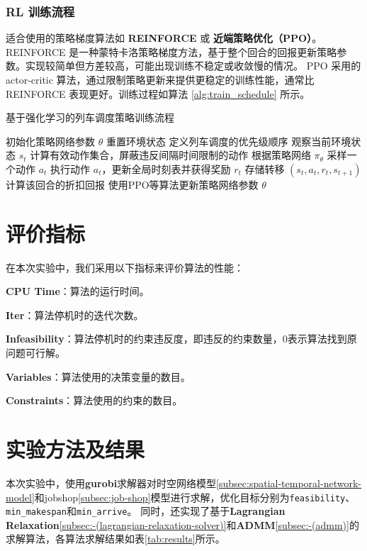 \documentclass{article}
\begin{document}
    \subsubsection{RL 训练流程}
    适合使用的策略梯度算法如 \textbf{REINFORCE} 或 \textbf{近端策略优化（PPO）}。
    REINFORCE 是一种蒙特卡洛策略梯度方法，基于整个回合的回报更新策略参数。实现较简单但方差较高，可能出现训练不稳定或收敛慢的情况。
    PPO 采用的 actor-critic 算法，通过限制策略更新来提供更稳定的训练性能，通常比 REINFORCE
    表现更好。训练过程如算法 \ref{alg:train_schedule} 所示。
    \begin{algorithm}[ht]
        \caption{基于强化学习的列车调度策略训练流程}
        \label{alg:train_schedule}
        \begin{algorithmic}[1]
            \State 初始化策略网络参数 $\theta$
            \Repeat
                \State 重置环境状态
                \State 定义列车调度的优先级顺序
                    \State 观察当前环境状态 $s_t$
                    \State 计算有效动作集合，屏蔽违反间隔时间限制的动作
                    \State 根据策略网络 $\pi_\theta$ 采样一个动作 $a_t$
                    \State 执行动作 $a_t$，更新全局时刻表并获得奖励 $r_t$
                    \State 存储转移 $(s_t, a_t, r_t, s_{t+1})$
                \EndFor
                \State 计算该回合的折扣回报
                \State 使用PPO等算法更新策略网络参数 $\theta$
        \end{algorithmic}
    \end{algorithm}


    \section{评价指标}
    在本次实验中，我们采用以下指标来评价算法的性能：

    \textbf{CPU Time}：算法的运行时间。

    \textbf{Iter}：算法停机时的迭代次数。

    \textbf{Infeasibility}：算法停机时的约束违反度，即违反的约束数量，$0$表示算法找到原问题可行解。

    \textbf{Variables}：算法使用的决策变量的数目。

    \textbf{Constraints}：算法使用的约束的数目。


    \section{实验方法及结果}
    本次实验中，使用\textbf{gurobi}求解器对时空网络模型\ref{subsec:spatial-temporal-network-model}和jobshop\ref{subsec:job-shop}模型进行求解，优化目标分别为\texttt{feasibility}、\texttt{min\_makespan}和\texttt{min\_arrive}。
    同时，还实现了基于\textbf{Lagrangian Relaxation}\ref{subsec:-(lagrangian-relaxation-solver)}和\textbf{ADMM}\ref{subsec:-(admm)}的求解算法，各算法求解结果如表\ref{tab:results}所示。
\end{document}
